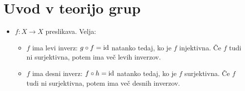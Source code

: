 \section{Uvod v teorijo grup}
\begin{itemize}
    \item \(f: X \to X\) preslikava. Velja:
    \begin{itemize}
        \item \(f\) ima levi inverz: \(g \circ f = \operatorname{id}\) natanko tedaj, ko je \(f\) injektivna. Če \(f\) tudi ni surjektivna, potem ima več levih inverzov.
        \item \(f\) ima desni inverz: \(f \circ h = \operatorname{id}\) natanko tedaj, ko je \(f\) surjektivna. Če \(f\) tudi ni surjektivna, potem ima več desnih inverzov.
    \end{itemize}
\end{itemize}